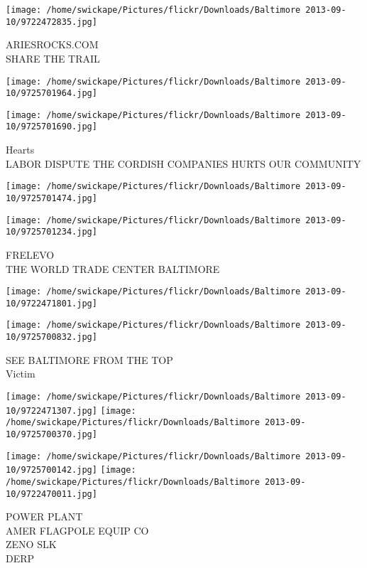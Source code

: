 \documentclass[10pt,letterpaper]{article}
\begin{document}
\vspace{0.25in}
\texttt{[image: /home/swickape/Pictures/flickr/Downloads/Baltimore 2013-09-10/9722472835.jpg]}

ARIESROCKS.COM\\
SHARE THE TRAIL\\
\pagebreak

\texttt{[image: /home/swickape/Pictures/flickr/Downloads/Baltimore 2013-09-10/9725701964.jpg]}

\vspace{0.25in}
\texttt{[image: /home/swickape/Pictures/flickr/Downloads/Baltimore 2013-09-10/9725701690.jpg]}

Hearts\\
LABOR DISPUTE THE CORDISH COMPANIES HURTS OUR COMMUNITY\\
\pagebreak

\texttt{[image: /home/swickape/Pictures/flickr/Downloads/Baltimore 2013-09-10/9725701474.jpg]}

\vspace{0.25in}
\texttt{[image: /home/swickape/Pictures/flickr/Downloads/Baltimore 2013-09-10/9725701234.jpg]}

FRELEVO\\
THE WORLD TRADE CENTER BALTIMORE\\
\pagebreak

\texttt{[image: /home/swickape/Pictures/flickr/Downloads/Baltimore 2013-09-10/9722471801.jpg]}

\vspace{0.25in}
\texttt{[image: /home/swickape/Pictures/flickr/Downloads/Baltimore 2013-09-10/9725700832.jpg]}

SEE BALTIMORE FROM THE TOP\\
Victim\\
\pagebreak

\texttt{[image: /home/swickape/Pictures/flickr/Downloads/Baltimore 2013-09-10/9722471307.jpg]}
\texttt{[image: /home/swickape/Pictures/flickr/Downloads/Baltimore 2013-09-10/9725700370.jpg]}

\texttt{[image: /home/swickape/Pictures/flickr/Downloads/Baltimore 2013-09-10/9725700142.jpg]}
\texttt{[image: /home/swickape/Pictures/flickr/Downloads/Baltimore 2013-09-10/9722470011.jpg]}

POWER PLANT\\
AMER FLAGPOLE EQUIP CO\\
ZENO SLK\\
DERP\\
\pagebreak
\end{document}
